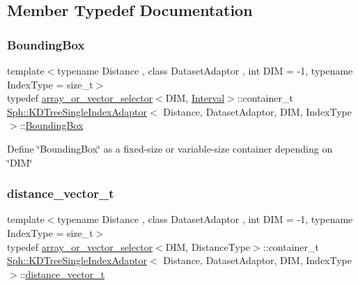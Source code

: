 \subsection{Member Typedef Documentation}
\hypertarget{classSph_1_1KDTreeSingleIndexAdaptor_aaf4a44f184e81388817dbffb5771f186}{}\label{classSph_1_1KDTreeSingleIndexAdaptor_aaf4a44f184e81388817dbffb5771f186} 
\subsubsection{\texorpdfstring{Bounding\+Box}{BoundingBox}}
{\footnotesize\ttfamily template$<$typename Distance , class Dataset\+Adaptor , int D\+IM = -\/1, typename Index\+Type  = size\+\_\+t$>$ \\
typedef \hyperlink{structSph_1_1array__or__vector__selector}{array\+\_\+or\+\_\+vector\+\_\+selector}$<$D\+IM, \hyperlink{structSph_1_1KDTreeSingleIndexAdaptor_1_1Interval}{Interval}$>$\+::container\+\_\+t \hyperlink{classSph_1_1KDTreeSingleIndexAdaptor}{Sph\+::\+K\+D\+Tree\+Single\+Index\+Adaptor}$<$ Distance, Dataset\+Adaptor, D\+IM, Index\+Type $>$\+::\hyperlink{classSph_1_1KDTreeSingleIndexAdaptor_aaf4a44f184e81388817dbffb5771f186}{Bounding\+Box}\hspace{0.3cm}{\ttfamily [protected]}}

Define \char`\"{}\+Bounding\+Box\char`\"{} as a fixed-\/size or variable-\/size container depending on \char`\"{}\+D\+I\+M\char`\"{} \hypertarget{classSph_1_1KDTreeSingleIndexAdaptor_a662e739c535b91fc6a837595f00d28cb}{}\label{classSph_1_1KDTreeSingleIndexAdaptor_a662e739c535b91fc6a837595f00d28cb} 
\subsubsection{\texorpdfstring{distance\+\_\+vector\+\_\+t}{distance\_vector\_t}}
{\footnotesize\ttfamily template$<$typename Distance , class Dataset\+Adaptor , int D\+IM = -\/1, typename Index\+Type  = size\+\_\+t$>$ \\
typedef \hyperlink{structSph_1_1array__or__vector__selector}{array\+\_\+or\+\_\+vector\+\_\+selector}$<$D\+IM, Distance\+Type$>$\+::container\+\_\+t \hyperlink{classSph_1_1KDTreeSingleIndexAdaptor}{Sph\+::\+K\+D\+Tree\+Single\+Index\+Adaptor}$<$ Distance, Dataset\+Adaptor, D\+IM, Index\+Type $>$\+::\hyperlink{classSph_1_1KDTreeSingleIndexAdaptor_a662e739c535b91fc6a837595f00d28cb}{distance\+\_\+vector\+\_\+t}\hspace{0.3cm}{\ttfamily [protected]}}


